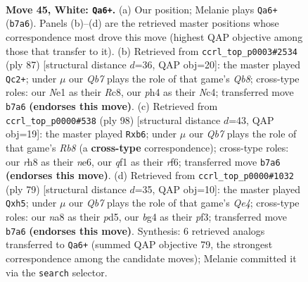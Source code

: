 \documentclass[11pt]{article}
\begin{document}
\clearpage

\begin{figure}[p]\centering
\begin{subfigure}{0.46\textwidth}\centering
\resizebox{\linewidth}{!}{%
\newchessgame
\chessboard[
  setfen={n6r/1Q6/6k1/1p6/6bp/P2P4/7K/4Nq2 w - - 4 45},
  showmover=false,
  pgfstyle=straightmove, color=movearrow, markmove={b7-a6}
]}
\caption{}
\end{subfigure}\hfill
\begin{subfigure}{0.46\textwidth}\centering
\resizebox{\linewidth}{!}{%
\newchessgame
\chessboard[
  setfen={2r4k/3Q1p2/8/4p3/2n5/1NP2PR1/7K/1q6 b - - 3 44},
  showmover=false,
  pgfstyle=straightmove, color=movearrow, markmove={b1-c2}
]}
\caption{}
\end{subfigure}
\\[4pt]
\begin{subfigure}{0.46\textwidth}\centering
\resizebox{\linewidth}{!}{%
\newchessgame
\chessboard[
  setfen={1R6/5N1k/pp2nr1p/8/P7/4K3/1P6/8 w - - 0 50},
  showmover=false,
  pgfstyle=straightmove, color=movearrow, markmove={b8-b6}
]}
\caption{}
\end{subfigure}\hfill
\begin{subfigure}{0.46\textwidth}\centering
\resizebox{\linewidth}{!}{%
\newchessgame
\chessboard[
  setfen={6k1/2p5/7p/3Pq2N/8/5P1P/3Q4/7K b - - 0 40},
  showmover=false,
  pgfstyle=straightmove, color=movearrow, markmove={e5-h5}
]}
\caption{}
\end{subfigure}
\caption{\textbf{Move 45, White: \texttt{Qa6+}.} (a) Our position; Melanie plays \texttt{Qa6+} (\texttt{b7a6}). Panels (b)--(d) are the retrieved master positions whose correspondence most drove this move (highest QAP objective among those that transfer to it). (b) Retrieved from \texttt{ccrl\_top\_p0003\#2534} (ply 87) [structural distance $d$=36, QAP obj=20]: the master played \texttt{Qc2+}; under $\mu$ our \emph{Qb7} plays the role of that game's \emph{Qb8}; cross-type roles: our \emph{N}e1 as their \emph{R}c8, our \emph{p}h4 as their \emph{N}c4; transferred move \texttt{b7a6} \textbf{(endorses this move)}. (c) Retrieved from \texttt{ccrl\_top\_p0000\#538} (ply 98) [structural distance $d$=43, QAP obj=19]: the master played \texttt{Rxb6}; under $\mu$ our \emph{Qb7} plays the role of that game's \emph{Rb8} (a \textbf{cross-type} correspondence); cross-type roles: our \emph{r}h8 as their \emph{n}e6, our \emph{q}f1 as their \emph{r}f6; transferred move \texttt{b7a6} \textbf{(endorses this move)}. (d) Retrieved from \texttt{ccrl\_top\_p0000\#1032} (ply 79) [structural distance $d$=35, QAP obj=10]: the master played \texttt{Qxh5}; under $\mu$ our \emph{Qb7} plays the role of that game's \emph{Qe4}; cross-type roles: our \emph{n}a8 as their \emph{p}d5, our \emph{b}g4 as their \emph{p}f3; transferred move \texttt{b7a6} \textbf{(endorses this move)}. Synthesis: 6 retrieved analogs transferred to \texttt{Qa6+} (summed QAP objective 79, the strongest correspondence among the candidate moves); Melanie committed it via the \texttt{search} selector.}
\label{fig:thought-m88}
\end{figure}
\end{document}
